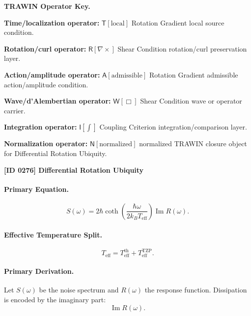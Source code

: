 \par\vspace{0.45\baselineskip}
\noindent\begin{minipage}[t]{\linewidth}
\begingroup
\small
\raggedright
\textbf{TRAWIN Operator Key.}\par
\noindent\textbf{Time/localization operator:} $\mathsf{T}\!\left[\mathrm{local}\right]$ Rotation Gradient local source condition.\par
\noindent\textbf{Rotation/curl operator:} $\mathsf{R}\!\left[\nabla\times\right]$ Shear Condition rotation/curl preservation layer.\par
\noindent\textbf{Action/amplitude operator:} $\mathsf{A}\!\left[\mathrm{admissible}\right]$ Rotation Gradient admissible action/amplitude condition.\par
\noindent\textbf{Wave/d'Alembertian operator:} $\mathsf{W}\!\left[\Box\right]$ Shear Condition wave or operator carrier.\par
\noindent\textbf{Integration operator:} $\mathsf{I}\!\left[\int\right]$ Coupling Criterion integration/comparison layer.\par
\noindent\textbf{Normalization operator:} $\mathsf{N}\!\left[\mathrm{normalized}\right]$ normalized TRAWIN closure object for Differential Rotation Ubiquity.\par
\endgroup
\end{minipage}

\clearpage
\noindent\textbf{[ID 0276] Differential Rotation Ubiquity}\par
\vspace{0.35em}
\paragraph{Primary Equation.}
\begin{equation}
S(\omega)
=
2\hbar
\coth\left(
\frac{\hbar\omega}{2k_B T_{\mathrm{eff}}}
\right)
\operatorname{Im}R(\omega).
\end{equation}

\paragraph{Effective Temperature Split.}
\begin{equation}
T_{\mathrm{eff}}
=
T_{\mathrm{eff}}^{\mathrm{th}}
+
T_{\mathrm{eff}}^{\mathrm{TZP}} .
\end{equation}

\paragraph{Primary Derivation.}
Let $S(\omega)$ be the noise spectrum and $R(\omega)$ the response function.  
Dissipation is encoded by the imaginary part:
\begin{equation}
\operatorname{Im}R(\omega).
\end{equation}

